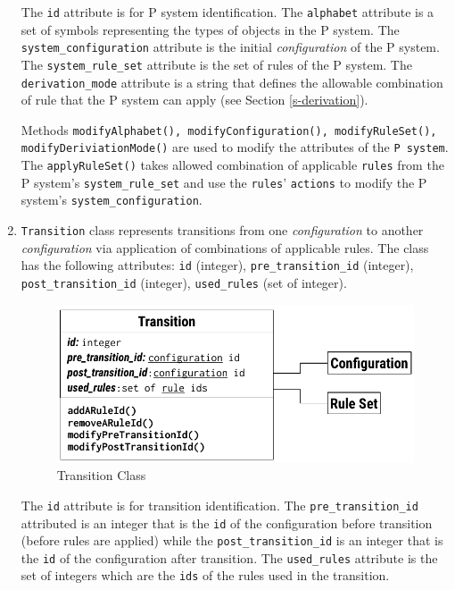 \documentclass{article}
\begin{document}
\begin{enumerate}
The \texttt{id} attribute is for P system identification. The \texttt{alphabet} attribute is a set 
of symbols representing the types of objects in the P system. The \texttt{system\_configuration}
attribute is the initial \textit{configuration} of the P system. The \texttt{system\_rule\_set}
attribute is the set of rules of the P system. The \texttt{derivation\_mode} attribute is a string
that defines the allowable combination of rule that the P system can apply (see Section 
\ref{s-derivation}).

Methods \texttt{modifyAlphabet(), modifyConfiguration(), modifyRuleSet(), modifyDeriviationMode()}
are used to modify the attributes of the \texttt{P system}. The \texttt{applyRuleSet()} takes
allowed combination of applicable \texttt{rules} from the P system's \texttt{system\_rule\_set} and
use the \texttt{rules}' \texttt{actions} to modify the P system's \texttt{system\_configuration}.


\item \texttt{Transition} class represents transitions from one \textit{configuration} to another
\textit{configuration} via application of combinations of applicable rules. The class has the
following attributes: \texttt{id} (integer), \texttt{pre\_transition\_id} (integer), 
\texttt{post\_transition\_id} (integer), \texttt{used\_rules} (set of integer).

\begin{figure}[H]
\begin{center}
    \includegraphics[scale=0.8]{figures/zzz-transition.pdf}
    \caption{Transition Class}
    \label{fig:transition-class}
\end{center}
\end{figure}

The \texttt{id} attribute is for transition identification. The \texttt{pre\_transition\_id}
attributed is an integer that is the \texttt{id} of the configuration before transition (before
rules are applied) while the \texttt{post\_transition\_id} is an integer that is the \texttt{id} of
the configuration after transition. The \texttt{used\_rules} attribute is the set of integers which
are the \texttt{ids} of the rules used in the transition.


\end{enumerate}
\end{document}
